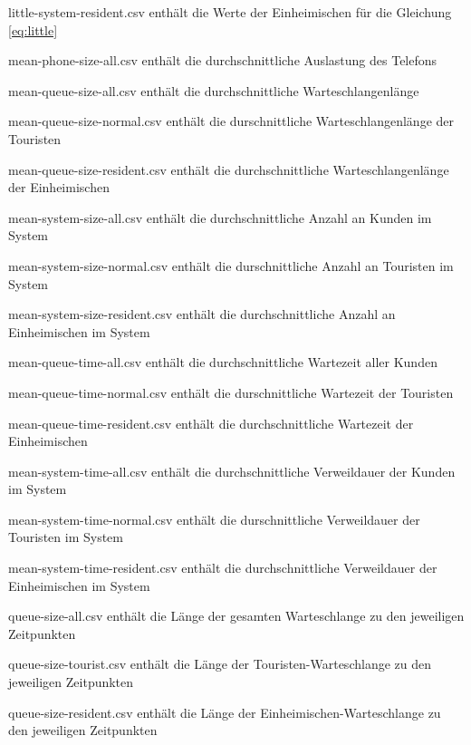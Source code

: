 \begin{list}{•}
    	\item little-system-resident.csv enthält die Werte der Einheimischen für die Gleichung \ref{eq:little}
    	\item mean-phone-size-all.csv enthält die durchschnittliche Auslastung des Telefons
    	\item mean-queue-size-all.csv enthält die durchschnittliche Warteschlangenlänge
    	\item mean-queue-size-normal.csv enthält die durschnittliche Warteschlangenlänge der Touristen
    	\item mean-queue-size-resident.csv enthält die durchschnittliche Warteschlangenlänge der Einheimischen
    	\item mean-system-size-all.csv enthält die durchschnittliche Anzahl an Kunden im System
    	\item mean-system-size-normal.csv enthält die durschnittliche Anzahl an Touristen im System
    	\item mean-system-size-resident.csv enthält die durchschnittliche Anzahl an Einheimischen im System
    	\item mean-queue-time-all.csv enthält die durchschnittliche Wartezeit aller Kunden
    	\item mean-queue-time-normal.csv enthält die durschnittliche Wartezeit der Touristen
    	\item mean-queue-time-resident.csv enthält die durchschnittliche Wartezeit der Einheimischen
    	\item mean-system-time-all.csv enthält die durchschnittliche Verweildauer der Kunden im System
    	\item mean-system-time-normal.csv enthält die durschnittliche Verweildauer der Touristen im System
    	\item mean-system-time-resident.csv enthält die durchschnittliche Verweildauer der Einheimischen im System
    	\item queue-size-all.csv enthält die Länge der gesamten Warteschlange zu den jeweiligen Zeitpunkten
    	\item queue-size-tourist.csv enthält die Länge der Touristen-Warteschlange zu den jeweiligen Zeitpunkten
    	\item queue-size-resident.csv enthält die Länge der Einheimischen-Warteschlange zu den jeweiligen Zeitpunkten

\end{list}
